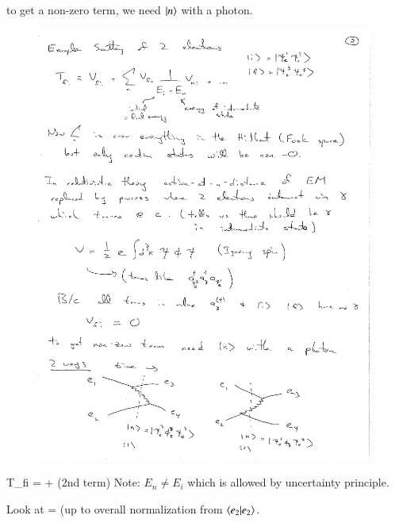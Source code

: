 {to get a non-zero term, we need $\ket{n}$ with a photon. 
\begin{figure}[h]
\centering
\includegraphics[width=0.99\textwidth]{./eeScattering.pdf}
\end{figure}



\be
T_{fi} =  + \textrm{(2nd term)}
\ee
Note: $E_n \ne E_i$ which is allowed by uncertainty principle.


Look at 
\be
{} = 
\ee
(up to overall normalization from $\braket{e_2|e_2}$.




}


